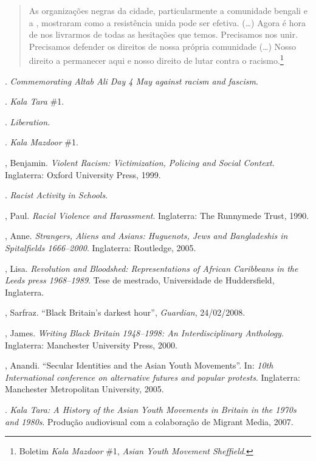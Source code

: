\begin{quote}
As organizações negras da cidade, particularmente a comunidade bengali e a , mostraram como a resistência unida pode ser efetiva. (\ldots{}) Agora é hora de nos livrarmos de todas as hesitações que temos. Precisamos nos unir. Precisamos defender os direitos de nossa própria comunidade (\ldots{}) Nosso direito a permanecer aqui e nosso direito de lutar contra o racismo.\footnote{Boletim \emph{Kala Mazdoor} \#1, \emph{Asian Youth Movement Sheffield}.}
\end{quote}



\begin{bibliohedra}
. \emph{Commemorating Altab Ali Day 4 May against racism and fascism}.

. \emph{Kala Tara} \#1.

. \emph{Liberation}.

. \emph{Kala Mazdoor} \#1.

, Benjamin. \emph{Violent Racism: Victimization, Policing and Social Context}. Inglaterra: Oxford University Press, 1999.

. \emph{Racist Activity in Schools}.

, Paul. \emph{Racial Violence and Harassment}. Inglaterra: The Runnymede Trust, 1990.

, Anne. \emph{Strangers, Aliens and Asians: Huguenots, Jews and Bangladeshis in Spitalfields 1666--2000}. Inglaterra: Routledge, 2005.

, Lisa. \emph{Revolution and Bloodshed: Representations of African Caribbeans in the Leeds press 1968--1989}. Tese de mestrado, Universidade de Huddersfield, Inglaterra.

, Sarfraz. ``Black Britain's darkest hour'', \emph{Guardian}, 24/02/2008.

, James. \emph{Writing Black Britain 1948--1998: An Interdisciplinary Anthology}. Inglaterra: Manchester University Press, 2000.

, Anandi. ``Secular Identities and the Asian Youth Movements''. In: \emph{10th International conference on alternative futures and popular protests}. Inglaterra: Manchester Metropolitan University, 2005.

\tit{\_\_\_\_\_\_}. \emph{Kala Tara: A History of the Asian Youth Movements in Britain in the 1970s and 1980s}. Produção audiovisual com a colaboração de Migrant Media, 2007.


\end{bibliohedra}

